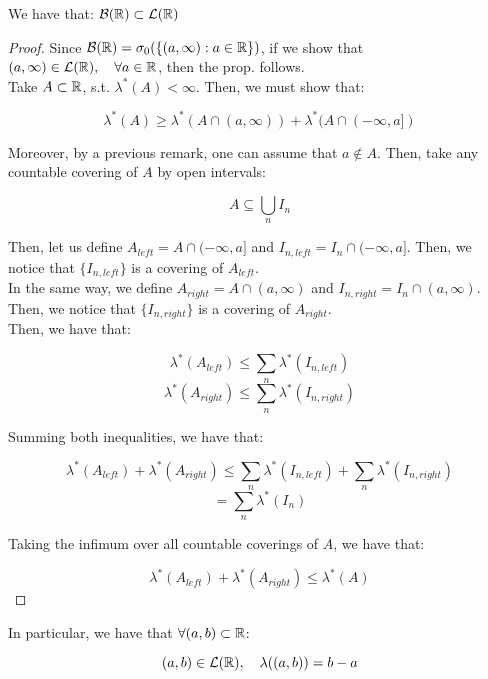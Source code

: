 \begin{fproposition}
    We have that: $\mathcal{B}(\mathbb{R}) \subset \mathcal{L}(\mathbb{R})$
\end{fproposition}

\begin{proof}
    Since $\mathcal{B}(\mathbb{R}) = \sigma_0(\{(a, \infty): a \in \mathbb{R}\})$, if we show that 
    $(a, \infty) \in \mathcal{L}(\mathbb{R}), \quad \forall a \in \mathbb{R}$, then the prop. follows.\\

    Take $A \subset \mathbb{R}$, s.t. $\lambda^{*}(A) < \infty$. Then, we must show that:

    $$\lambda^{*}(A) \geq \lambda^{*}(A \cap (a, \infty)) + \lambda^{*}(A \cap (-\infty, a])$$

    Moreover, by a previous remark, one can assume that $a \notin A$. Then, take any countable
    covering of $A$ by open intervals:

    $$A \subseteq \bigcup_{n} I_n$$

    Then, let us define $A_{left} = A \cap (-\infty, a]$ and $I_{n, left} = I_n \cap (-\infty, a]$.
    Then, we notice that $\{I_{n, left}\}$ is a covering of $A_{left}$.\\

    In the same way, we define $A_{right} = A \cap (a, \infty)$ and $I_{n, right} = I_n \cap (a, \infty)$.
    Then, we notice that $\{I_{n, right}\}$ is a covering of $A_{right}$.\\

    Then, we have that:

    $$\lambda^{*}(A_{left}) \leq \sum_{n} \lambda^{*}(I_{n, left})$$
    $$\lambda^{*}(A_{right}) \leq \sum_{n} \lambda^{*}(I_{n, right})$$

    Summing both inequalities, we have that:

    $$\lambda^{*}(A_{left}) + \lambda^{*}(A_{right}) \leq \sum_{n} \lambda^{*}(I_{n, left}) + \sum_{n} \lambda^{*}(I_{n, right})$$
    $$ = \sum_{n} \lambda^{*}(I_n)$$

    Taking the infimum over all countable coverings of $A$, we have that:

    $$\lambda^{*}(A_{left}) + \lambda^{*}(A_{right}) \leq \lambda^{*}(A)$$

\end{proof}


\begin{fremark}
    In particular, we have that $\forall (a, b) \subset \mathbb{R}$:

    $$(a, b) \in \mathcal{L}(\mathbb{R}), \quad \lambda((a, b)) = b - a$$
\end{fremark}

